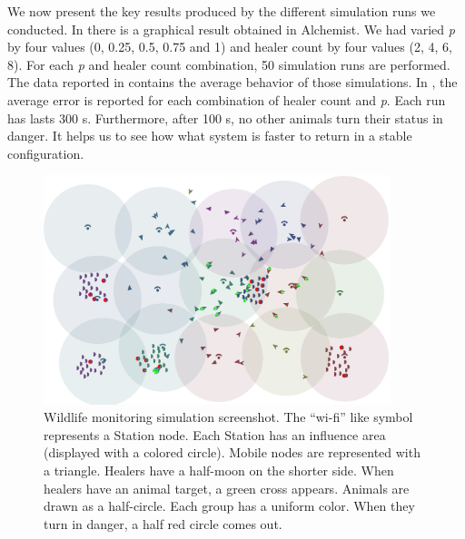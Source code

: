 \documentclass[jsan,article,accept,moreauthors,pdftex]{Definitions/mdpi}
\begin{document}
\begin{paracol}{2}
We now present the key results produced 
 by the different simulation runs we conducted. In  there is
 a graphical result obtained in Alchemist.
%
 We had varied \emph{p} by four values (0, 0.25, 0.5, 0.75 and 1) and {healer count} by four values (2, 4, 6, 8). 
 For each \emph{p} and {healer count} combination, 50 simulation runs are performed. 
 The data reported in \mbox{} contains the average behavior of those simulations. 
% 
In , the average error is reported for each combination of {healer count} and \emph{p}.
%
Each run has lasts 300 s. 
 Furthermore, after 100 s, no other animals turn their status in danger.
 It helps us to see how what system is faster to return in a stable configuration.
 
\end{paracol}
\nointerlineskip
 \begin{figure}[H]
\widefigure
\includegraphics[width=0.9\textwidth]{imgs/alchemist-v2.png}

\caption{Wildlife monitoring simulation screenshot. 
 The ``wi-fi'' like symbol represents a {Station} node. 
 Each {Station} has an influence area (displayed with a colored circle). 
 Mobile nodes are represented with a triangle.
 Healers have a half-moon on the shorter side. 
 When healers have an animal target, a green cross appears. 
 Animals are drawn as a half-circle. Each group has a uniform color. 
 When they turn in danger, a half red circle comes out.
}
\label{fig:wildlife-monitoring-gui}
\end{figure}
\end{document}
